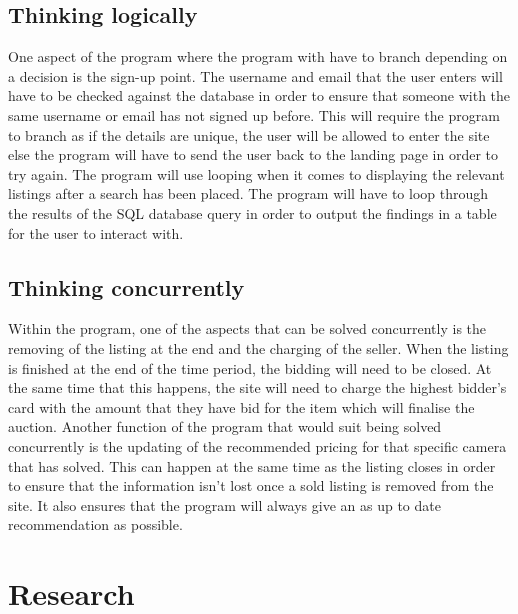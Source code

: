 \subsection{Thinking logically}
One aspect of the program where the program with have to branch depending on a decision is the sign-up point. The username and email that the user enters will have to be checked against the database in order to ensure that someone with the same username or email has not signed up before. This will require the program to branch as if the details are unique, the user will be allowed to enter the site else the program will have to send the user back to the landing page in order to try again. The program will use looping when it comes to displaying the relevant listings after a search has been placed. The program will have to loop through the results of the SQL database query in order to output the findings in a table for the user to interact with. 
\subsection{Thinking concurrently}
Within the program, one of the aspects that can be solved concurrently is the removing of the listing at the end and the charging of the seller. When the listing is finished at the end of the time period, the bidding will need to be closed. At the same time that this happens, the site will need to charge the highest bidder’s card with the amount that they have bid for the item which will finalise the auction. Another function of the program that would suit being solved concurrently is the updating of the recommended pricing for that specific camera that has solved. This can happen at the same time as the listing closes in order to ensure that the information isn’t lost once a sold listing is removed from the site. It also ensures that the program will always give an as up to date recommendation as possible. 

\section{Research}
